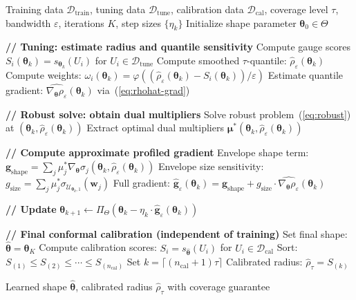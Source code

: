 \documentclass[lettersize,journal]{IEEEtran}
\newcommand{\cU}{\mathcal{U}}
\newcommand{\cD}{\mathcal{D}}
\newcommand{\btheta}{\bm{\theta}}
\newcommand{\bmu}{\bm{\mu}}
\newcommand{\bw}{\bm{w}}
\newcommand{\bg}{\bm{g}}
\theoremstyle{definition}
\begin{document}
\begin{algorithm}[!t]
\caption{Tuning-Based Profiled Gradient Training with Conformal Calibration}
\label{alg:main}
\begin{algorithmic}[1]
\REQUIRE Training data $\cD_{\text{train}}$, tuning data $\cD_{\text{tune}}$, calibration data $\cD_{\text{cal}}$, coverage level $\tau$, bandwidth $\varepsilon$, iterations $K$, step sizes $\{\eta_k\}$
\STATE Initialize shape parameter $\btheta_0 \in \Theta$

    \STATE \textbf{// Tuning: estimate radius and quantile sensitivity}
    \STATE Compute gauge scores $S_i(\btheta_k) = s_{\btheta_k}(U_i)$ for $U_i \in \cD_{\text{tune}}$
    \STATE Compute smoothed $\tau$-quantile: $\hat{\rho}_\varepsilon(\btheta_k)$
    \STATE Compute weights: $\omega_i(\btheta_k) = \varphi((\hat{\rho}_\varepsilon(\btheta_k) - S_i(\btheta_k))/\varepsilon)$
    \STATE Estimate quantile gradient: $\widehat{\nabla_{\btheta}\rho_\varepsilon}(\btheta_k)$ via~(\ref{eq:rhohat-grad})

    \STATE \textbf{// Robust solve: obtain dual multipliers}
    \STATE Solve robust problem~(\ref{eq:robust}) at $(\btheta_k, \hat{\rho}_\varepsilon(\btheta_k))$
    \STATE Extract optimal dual multipliers $\bmu^*(\btheta_k, \hat{\rho}_\varepsilon(\btheta_k))$

    \STATE \textbf{// Compute approximate profiled gradient}
    \STATE Envelope shape term: $\bg_{\text{shape}} = \sum_j \mu_j^* \nabla_{\btheta} \sigma_j(\btheta_k, \hat{\rho}_\varepsilon(\btheta_k))$
    \STATE Envelope size sensitivity: $g_{\text{size}} = \sum_j \mu_j^* \sigma_{\cU_{\btheta_k,1}}(\bw_j)$
    \STATE Full gradient: $\hat{\bg}_\varepsilon(\btheta_k) = \bg_{\text{shape}} + g_{\text{size}} \cdot \widehat{\nabla_{\btheta}\rho_\varepsilon}(\btheta_k)$

    \STATE \textbf{// Update}
    \STATE $\btheta_{k+1} \leftarrow \Pi_\Theta(\btheta_k - \eta_k \cdot \hat{\bg}_\varepsilon(\btheta_k))$
\ENDFOR

\STATE \textbf{// Final conformal calibration (independent of training)}
\STATE Set final shape: $\hat{\btheta} = \btheta_K$
\STATE Compute calibration scores: $S_i = s_{\hat{\btheta}}(U_i)$ for $U_i \in \cD_{\text{cal}}$
\STATE Sort: $S_{(1)} \leq S_{(2)} \leq \cdots \leq S_{(n_{\text{cal}})}$
\STATE Set $k = \lceil(n_{\text{cal}}+1)\tau\rceil$
\STATE Calibrated radius: $\hat{\rho}_\tau = S_{(k)}$

\ENSURE Learned shape $\hat{\btheta}$, calibrated radius $\hat{\rho}_\tau$ with coverage guarantee
\end{algorithmic}
\end{algorithm}
\end{document}
